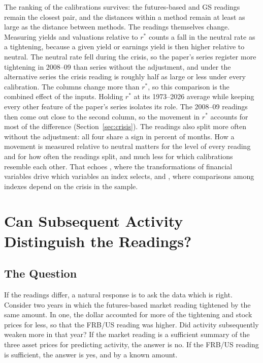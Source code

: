The ranking of the calibrations survives: the futures-based and GS readings remain the closest pair, and the distances within a method remain at least as large as the distance between methods. The readings themselves change. Measuring yields and valuations relative to $r^*$ counts a fall in the neutral rate as a tightening, because a given yield or earnings yield is then higher relative to neutral. The neutral rate fell during the crisis, so the paper's series register more tightening in 2008--09 than series without the adjustment, and under the alternative series the crisis reading is roughly half as large or less under every calibration. The columns change more than $r^*$, so this comparison is the combined effect of the inputs. Holding $r^*$ at its 1973--2026 average while keeping every other feature of the paper's series isolates its role. The 2008--09 readings then come out close to the second column, so the movement in $r^*$ accounts for most of the difference (Section~\ref{sec:crisis}). The readings also split more often without the adjustment: all four share a sign in  percent of months. How a movement is measured relative to neutral matters for the level of every reading and for how often the readings split, and much less for which calibrations resemble each other. That echoes \citet{kiley2020ml}, where the transformations of financial variables drive which variables an index selects, and \citet{aramonte2013}, where comparisons among indexes depend on the crisis in the sample.
\FloatBarrier

\section{Can Subsequent Activity Distinguish the Readings?}\label{sec:outlook}
\subsection{The Question}\label{sec:onetest}
If the readings differ, a natural response is to ask the data which is right. Consider two years in which the futures-based market reading tightened by the same amount. In one, the dollar accounted for more of the tightening and stock prices for less, so that the FRB/US reading was higher. Did activity subsequently weaken more in that year? If the market reading is a sufficient summary of the three asset prices for predicting activity, the answer is no. If the FRB/US reading is sufficient, the answer is yes, and by a known amount.

